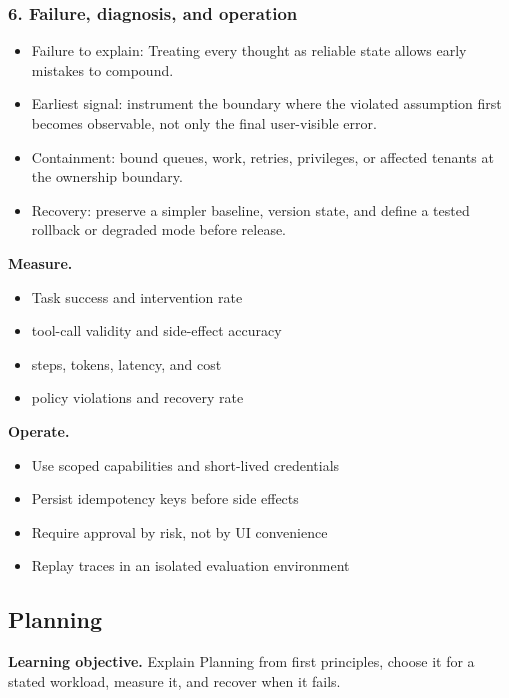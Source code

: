 \subsubsection*{6. Failure, diagnosis, and operation}
\begin{itemize}
\item Failure to explain: Treating every thought as reliable state allows early mistakes to compound.
\item Earliest signal: instrument the boundary where the violated assumption first becomes observable, not only the final user-visible error.
\item Containment: bound queues, work, retries, privileges, or affected tenants at the ownership boundary.
\item Recovery: preserve a simpler baseline, version state, and define a tested rollback or degraded mode before release.
\end{itemize}
\textbf{Measure.}\begin{itemize}
\item Task success and intervention rate
\item tool-call validity and side-effect accuracy
\item steps, tokens, latency, and cost
\item policy violations and recovery rate
\end{itemize}
\textbf{Operate.}\begin{itemize}
\item Use scoped capabilities and short-lived credentials
\item Persist idempotency keys before side effects
\item Require approval by risk, not by UI convenience
\item Replay traces in an isolated evaluation environment
\end{itemize}
\subsection{Planning}
\textbf{Learning objective.} Explain Planning from first principles, choose it for a stated workload, measure it, and recover when it fails.
